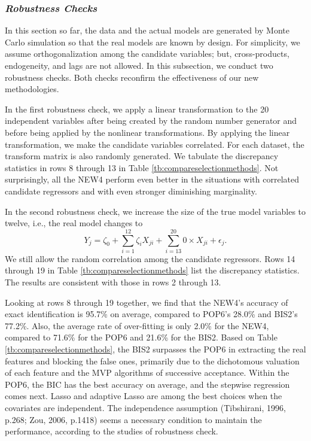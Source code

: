 \documentclass[a4paper,12pt]{article}
\begin{document}
\subsubsection{\textit{Robustness Checks}}
\noindent 
In this section so far, the data and the actual models are generated by Monte Carlo simulation so that the real models are known by design. 
For simplicity, we assume orthogonalization among the candidate variables; but, cross-products, endogeneity, and lags are not allowed.
In this subsection, we conduct two robustness checks. 
Both checks reconfirm the effectiveness of our new methodologies.

In the first robustness check, we apply a linear transformation to the 20 independent variables after being created by the random number generator and before being applied by the nonlinear transformations. 
By applying the linear transformation, we make the candidate variables correlated. 
For each dataset, the transform matrix is also randomly generated. 
We tabulate the discrepancy statistics in rows 8 through 13 in Table \ref{tb:compareselectionmethods}.
Not surprisingly,  all the NEW4 perform even better in the situations with correlated candidate regressors and with even stronger diminishing marginality.

In the second robustness check, we increase the size of the true model variables to twelve, i.e.,
the real model changes to
$$
Y_j = \zeta_0 + \sum\limits_{i=1}^{12} \zeta_i X_{ji} + \sum\limits_{i=13}^{20} 0 \times X_{ji} + \epsilon_j.
$$
We still allow the random correlation among the candidate regressors.
Rows 14 through 19 in Table \ref{tb:compareselectionmethods} list the discrepancy statistics. 
The results are consistent with those in rows 2 through 13.

Looking at rows 8 through 19 together, we find that the NEW4's accuracy of exact identification is 95.7\% on average, compared to POP6's 28.0\% and BIS2's 77.2\%.
Also, the average rate of over-fitting is only 2.0\% for the NEW4, compared to 71.6\% for the POP6 and 21.6\% for the BIS2.
Based on Table \ref{tb:compareselectionmethods}, the BIS2 surpasses the POP6 in extracting the real features and blocking the false ones, primarily due to the dichotomous valuation of each feature and the MVP algorithms of successive acceptance.
Within the POP6, the BIC has the best accuracy on average, and the stepwise regression comes next. 
Lasso and adaptive Lasso are among the best choices when the covariates are independent.
The independence assumption (Tibshirani, 1996, p.268; Zou, 2006, p.1418) seems a necessary condition to maintain the performance, according to the studies of robustness check.
\end{document}
